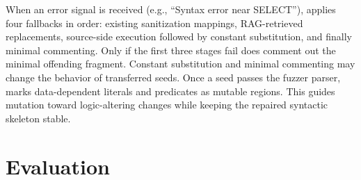\documentclass[conference]{IEEEtran}
\begin{document}
When an error signal is received (e.g., ``Syntax error near SELECT''), \tool{} applies four fallbacks in order: existing sanitization mappings, RAG-retrieved replacements, source-side execution followed by constant substitution, and finally minimal commenting.
Only if the first three stages fail does \tool{} comment out the minimal offending fragment.
Constant substitution and minimal commenting may change the behavior of transferred seeds.
Once a seed passes the fuzzer parser, \tool{} marks data-dependent literals and predicates as mutable regions.
This guides mutation toward logic-altering changes while keeping the repaired syntactic skeleton stable.
\section{Evaluation}
\label{sec:evaluation}
\end{document}

